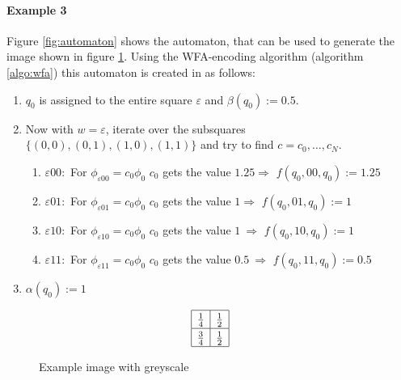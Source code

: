 \documentclass{article}
\begin{document}
\paragraph{Example 3} Figure \ref{fig:automaton} shows the automaton, that can be used to generate the image shown in figure \ref{fig:img}. Using the WFA-encoding algorithm (algorithm \ref{algo:wfa}) this automaton is created in as follows:
\begin{enumerate}
 \item $q_0$ is assigned to the entire square $\varepsilon$ and  $\beta(q_0):= 0.5$.
 \item Now with $w = \varepsilon$, iterate over the subsquares $\{(0,0),(0,1), (1,0), (1,1) \}$ and try to find $c = c_0,\dots,c_N$.
\begin{enumerate}
  \item $\varepsilon 00:$ For $\phi_{\varepsilon00} = c_0\phi_0 $ $c_0$ gets the value $1.25 \Rightarrow$ $f(q_0,00,q_0):= 1.25$
  \item $\varepsilon 01:$ For $\phi_{\varepsilon01} = c_0\phi_0 $ $c_0$ gets the value $1 \Rightarrow$ $f(q_0,01,q_0):= 1$
  \item $\varepsilon 10:$ For $\phi_{\varepsilon10} = c_0\phi_0 $ $c_0$ gets the value $1\ \Rightarrow$ $f(q_0,10,q_0):= 1$
  \item $\varepsilon 11:$ For $\phi_{\varepsilon11} = c_0\phi_0 $ $c_0$ gets the value $0.5\ \Rightarrow$ $f(q_0,11,q_0):= 0.5$
 \end{enumerate}

 
 
\item $\alpha(q_0) := 1$
\end{enumerate}

\begin{figure}[ht]
$$\renewcommand\arraystretch{1.3}\begin{array}{|c|c|}
 \hline
 \frac{1}{4} & \frac{1}{2} \\
 \hline
 \frac{3}{4} & \frac{1}{2} \\
 \hline
\end{array}$$
\caption{Example image with greyscale}
\label{fig:img}
\end{figure}
\end{document}
